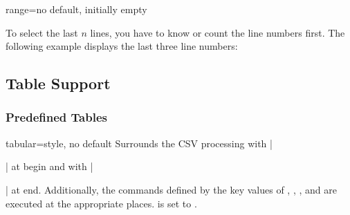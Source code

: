 \documentclass[a4paper,11pt]{ltxdoc}
\begin{document}
\begin{docCsvKey}[][doc new and updated={2021-06-29}{2022-09-21}]{range}{=}{no default, initially empty}
\begin{dispExample}
\end{dispExample}

\begin{dispExample}
\end{dispExample}

To select the last $n$ lines, you have to know or count the line numbers first.
The following example displays the last three line numbers:

\begin{dispExample}
\end{dispExample}

\end{docCsvKey}



\clearpage
\subsection{Table Support}\label{subsec:tabsupport}%

\subsubsection{Predefined Tables}\label{subsubsec:table_predef}

\begin{docCsvKey}{tabular}{=}{style, no default}
  Surrounds the CSV processing with |\begin{tabular}|
  at begin and with |\end{tabular}| at end.
  Additionally, the commands defined by the key values of
  , , ,
  and  are executed at the appropriate places.
   is set to \cs{}\cs{}.
\end{docCsvKey}
\end{document}
